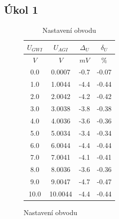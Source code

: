 \documentclass{article}
\begin{document}
\subsection{Úkol 1}
\begin{figure}[H]
    \begin{minipage}[t]{0.4\textwidth}
        \begin{table}[H]
            \vspace{-75mm}
            \begin{tabular}{|c|c|c|c|}
            \hline
                \(U_{GWI}\)        &	\(U_{AGI}\)            &	\(\Delta_U\)        & \(\delta_U\)       \\ \hline
                \(V\)              &    \(V\)                  &	\(mV\)              & \(\%\) \\ \hline
                 0.0               &    0.0007	               &    -0.7                & -0.07 \\ \hline
                 1.0               &    1.0044	               &    -4.4                & -0.44 \\ \hline
                 2.0               &    2.0042	               &    -4.2                & -0.42 \\ \hline
                 3.0               &    3.0038	               &    -3.8                & -0.38 \\ \hline
                 4.0               &    4.0036	               &    -3.6                & -0.36 \\ \hline
                 5.0               &    5.0034	               &    -3.4                & -0.34 \\ \hline
                 6.0               &    6.0044	               &    -4.4                & -0.44 \\ \hline
                 7.0               &    7.0041	               &    -4.1                & -0.41 \\ \hline
                 8.0               &    8.0036	               &    -3.6                & -0.36 \\ \hline
                 9.0               &    9.0047	               &    -4.7                & -0.47 \\ \hline
                10.0               &    10.0044                &	-4.4                & -0.44 \\ \hline
            \end{tabular}
            \caption{\label{tab_pracovni_bod} Nastavení obvodu}
        \end{table}

\end{minipage}
\end{figure}
\end{document}
